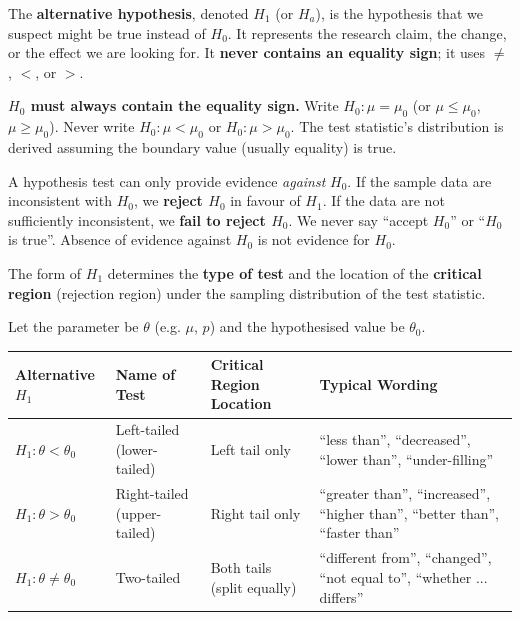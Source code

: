 \documentclass[11pt]{article}
\newcounter{popsec}
\newcounter{popsub}
\newcommand{\courssub}[1]{%
  \stepcounter{popsub}%
  \par\vspace{9pt}\noindent{\popxbold\fontsize{11.5}{13}\selectfont\color{popink}{\color{poporange}\thepopsec.\thepopsub}\hspace{6pt}#1}\par\nopagebreak\vspace{4pt}
}
\begin{document}
\begin{definition}
The \textbf{alternative hypothesis}, denoted $H_1$ (or $H_a$), is the hypothesis that we suspect might be true instead of $H_0$. It represents the research claim, the change, or the effect we are looking for. It \textbf{never contains an equality sign}; it uses $\neq$, $<$, or $>$.
\end{definition}

\begin{attention}
\textbf{$H_0$ must always contain the equality sign.} Write $H_0: \mu = \mu_0$ (or $\mu \le \mu_0$, $\mu \ge \mu_0$). Never write $H_0: \mu < \mu_0$ or $H_0: \mu > \mu_0$. The test statistic's distribution is derived assuming the boundary value (usually equality) is true.
\end{attention}

\begin{attention}
A hypothesis test can only provide evidence \emph{against} $H_0$. If the sample data are inconsistent with $H_0$, we \textbf{reject $H_0$} in favour of $H_1$. If the data are not sufficiently inconsistent, we \textbf{fail to reject $H_0$}. We never say ``accept $H_0$'' or ``$H_0$ is true''. Absence of evidence against $H_0$ is not evidence for $H_0$.
\end{attention}

\courssub{One-Tailed and Two-Tailed Tests}

The form of $H_1$ determines the \textbf{type of test} and the location of the \textbf{critical region} (rejection region) under the sampling distribution of the test statistic.

\begin{propriete}
Let the parameter be $\theta$ (e.g. $\mu$, $p$) and the hypothesised value be $\theta_0$.
\begin{center}
\begin{tabularx}{\linewidth}{|l|X|X|X|}
\hline
\textbf{Alternative $H_1$} & \textbf{Name of Test} & \textbf{Critical Region Location} & \textbf{Typical Wording} \\
\hline
$H_1: \theta < \theta_0$ & Left-tailed (lower-tailed) & Left tail only & ``less than'', ``decreased'', ``lower than'', ``under-filling'' \\
\hline
$H_1: \theta > \theta_0$ & Right-tailed (upper-tailed) & Right tail only & ``greater than'', ``increased'', ``higher than'', ``better than'', ``faster than'' \\
\hline
$H_1: \theta \neq \theta_0$ & Two-tailed & Both tails (split equally) & ``different from'', ``changed'', ``not equal to'', ``whether ... differs'' \\
\hline
\end{tabularx}
\end{center}
\end{propriete}
\end{document}
